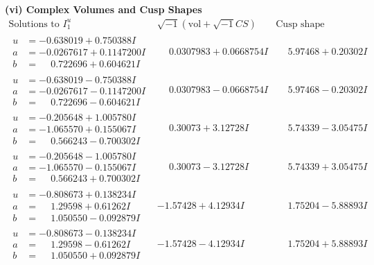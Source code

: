 \documentclass[1p]{elsarticle_modified}
\theoremstyle{definition}
\newcommand{\I}{\sqrt{-1}}
\begin{document}
\newpage\flushleft \textbf{(vi) Complex Volumes and Cusp Shapes}
$$\begin{array}{c|c|c}  
\text{Solutions to }I^u_{1}& \I (\text{vol} + \sqrt{-1}CS) & \text{Cusp shape}\\
 \hline 
\begin{aligned}
u &= -0.638019 + 0.750388 I \\
a &= -0.0267617 + 0.1147200 I \\
b &= \phantom{-}0.722696 + 0.604621 I\end{aligned}
 & \phantom{-}0.0307983 + 0.0668754 I & \phantom{-}5.97468 + 0.20302 I \\ \hline\begin{aligned}
u &= -0.638019 - 0.750388 I \\
a &= -0.0267617 - 0.1147200 I \\
b &= \phantom{-}0.722696 - 0.604621 I\end{aligned}
 & \phantom{-}0.0307983 - 0.0668754 I & \phantom{-}5.97468 - 0.20302 I \\ \hline\begin{aligned}
u &= -0.205648 + 1.005780 I \\
a &= -1.065570 + 0.155067 I \\
b &= \phantom{-}0.566243 - 0.700302 I\end{aligned}
 & \phantom{-}0.30073 + 3.12728 I & \phantom{-}5.74339 - 3.05475 I \\ \hline\begin{aligned}
u &= -0.205648 - 1.005780 I \\
a &= -1.065570 - 0.155067 I \\
b &= \phantom{-}0.566243 + 0.700302 I\end{aligned}
 & \phantom{-}0.30073 - 3.12728 I & \phantom{-}5.74339 + 3.05475 I \\ \hline\begin{aligned}
u &= -0.808673 + 0.138234 I \\
a &= \phantom{-}1.29598 + 0.61262 I \\
b &= \phantom{-}1.050550 - 0.092879 I\end{aligned}
 & -1.57428 + 4.12934 I & \phantom{-}1.75204 - 5.88893 I \\ \hline\begin{aligned}
u &= -0.808673 - 0.138234 I \\
a &= \phantom{-}1.29598 - 0.61262 I \\
b &= \phantom{-}1.050550 + 0.092879 I\end{aligned}
 & -1.57428 - 4.12934 I & \phantom{-}1.75204 + 5.88893 I \\ \hline\begin{aligned}

\end{aligned}
\end{array}$$
\end{document}
